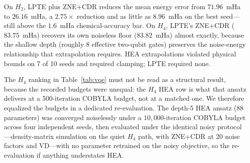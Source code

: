 \documentclass[twocolumn,aps,prl,superscriptaddress,showkeys]{revtex4-2}
\theoremstyle{plain}
\theoremstyle{definition}
\newcommand{\fakefez}{\texttt{FakeFez}}
\begin{document}
On $H_2$, LPTE plus ZNE+CDR reduces the mean energy error from $71.96$~mHa to $26.16$~mHa, a $2.75\times$ reduction and as little as $8.96$~mHa on the best seed---still above the $1.6$~mHa chemical-accuracy bar. On $H_4$, LPTE's ZNE+CDR ($83.75$~mHa) recovers its own noiseless floor ($83.82$~mHa) almost exactly, because the shallow depth (roughly 8 effective two-qubit gates) preserves the noise-energy relationship that extrapolation requires. HEA extrapolations violated physical bounds on 7 of 10 seeds and required clamping; LPTE required none.

The $H_4$ ranking in Table~\ref{tab:vqe} must not be read as a structural result, because the recorded budgets were unequal: the $H_4$ HEA row is what that ansatz delivers at a 500-iteration COBYLA budget, not at a matched one. We therefore equalized the budgets in a dedicated re-evaluation. The depth-5 HEA ansatz (88 parameters) was converged noiselessly under a $10{,}000$-iteration COBYLA budget across four independent seeds, then evaluated under the identical noisy protocol---density-matrix simulation on the quiet $H_4$ path, with ZNE+CDR at 20 noise factors and VD---with no parameter retrained on the noisy objective, so the re-evaluation if anything understates HEA.

\begin{table}[htbp]
\centering
\caption{Equalized-budget $H_4$ re-evaluation under \fakefez. HEA was re-converged noiselessly at a $10{,}000$-iteration COBYLA budget, then evaluated under the paper's full noisy protocol. The median over the four converged seeds is reported; ranges are in parentheses. LPTE rows are the recorded values from Table~\ref{tab:vqe}. At matched budget the energy ranking reverses: HEA reaches a lower noiseless error than LPTE.}
\label{tab:vqe-matched}
\end{table}
\end{document}
